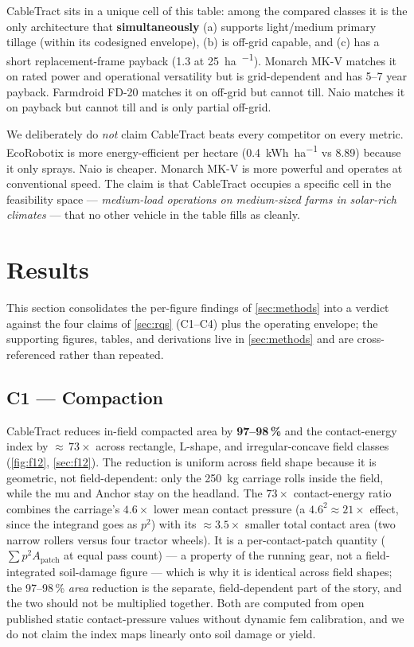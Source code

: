 \documentclass[11pt,a4paper]{article}
\begin{document}
CableTract sits in a unique cell of this table: among the compared classes it is the only architecture that \textbf{simultaneously} (a) supports light/medium primary tillage (within its codesigned envelope), (b) is off-grid capable, and (c) has a short replacement-frame payback (\SI{1.3}{\year} at \SI{25}{\hectare\per\year}). Monarch MK-V matches it on rated power and operational versatility but is grid-dependent and has 5--7 year payback. Farmdroid FD-20 matches it on off-grid but cannot till. Naio matches it on payback but cannot till and is only partial off-grid.

We deliberately do \emph{not} claim CableTract beats every competitor on every metric. EcoRobotix is more energy-efficient per hectare (\SI{0.4}{\kWh\per\hectare} vs 8.89) because it only sprays. Naio is cheaper. Monarch MK-V is more powerful and operates at conventional speed. The claim is that CableTract occupies a specific cell in the feasibility space --- \emph{medium-load operations on medium-sized farms in solar-rich climates} --- that no other vehicle in the table fills as cleanly.

\section{Results}\label{sec:results}

This section consolidates the per-figure findings of \cref{sec:methods} into a verdict against the four claims of \cref{sec:rqs} (C1--C4) plus the operating envelope; the supporting figures, tables, and derivations live in \cref{sec:methods} and are cross-referenced rather than repeated.

\subsection{C1 --- Compaction}\label{sec:r-c1}

CableTract reduces in-field compacted area by \textbf{97--98\,\%} and the contact-energy index by \textbf{${\approx}\,73\times$} across rectangle, L-shape, and irregular-concave field classes (\cref{fig:f12}, \cref{sec:f12}). The reduction is uniform across field shape because it is geometric, not field-dependent: only the \SI{250}{\kilogram} carriage rolls inside the field, while the \gls{mu} and Anchor stay on the headland. The $73\times$ contact-energy ratio combines the carriage's $4.6\times$ lower mean contact pressure (a $4.6^2 \approx 21\times$ effect, since the integrand goes as $p^2$) with its ${\approx}3.5\times$ smaller total contact area (two narrow rollers versus four tractor wheels). It is a per-contact-patch quantity ($\sum p^2 A_{\text{patch}}$ at equal pass count) --- a property of the running gear, not a field-integrated soil-damage figure --- which is why it is identical across field shapes; the 97--98\,\% \emph{area} reduction is the separate, field-dependent part of the story, and the two should not be multiplied together. Both are computed from open published static contact-pressure values without dynamic \gls{fem} calibration, and we do not claim the index maps linearly onto soil damage or yield.
\end{document}
